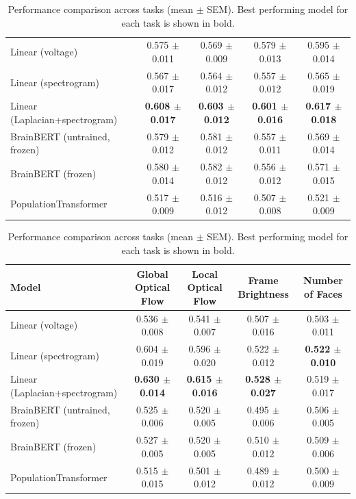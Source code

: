 \begin{table}[h]
\begin{tabular}{lcccc}
\hline
Linear (voltage) & 0.575 $\pm$ 0.011 & 0.569 $\pm$ 0.009 & 0.579 $\pm$ 0.013 & 0.595 $\pm$ 0.014 \\
Linear (spectrogram) & 0.567 $\pm$ 0.017 & 0.564 $\pm$ 0.012 & 0.557 $\pm$ 0.012 & 0.565 $\pm$ 0.019 \\
Linear (Laplacian+spectrogram) & \textbf{0.608 $\pm$ 0.017} & \textbf{0.603 $\pm$ 0.012} & \textbf{0.601 $\pm$ 0.016} & \textbf{0.617 $\pm$ 0.018} \\
BrainBERT (untrained, frozen) & 0.579 $\pm$ 0.012 & 0.581 $\pm$ 0.012 & 0.557 $\pm$ 0.011 & 0.569 $\pm$ 0.014 \\
BrainBERT (frozen) & 0.580 $\pm$ 0.014 & 0.582 $\pm$ 0.012 & 0.556 $\pm$ 0.012 & 0.571 $\pm$ 0.015 \\
PopulationTransformer & 0.517 $\pm$ 0.009 & 0.516 $\pm$ 0.012 & 0.507 $\pm$ 0.008 & 0.521 $\pm$ 0.009 \\
\hline
\end{tabular}
\hspace{1em}
\begin{tabular}{lcccc}
\hline
Model & Global Optical Flow & Local Optical Flow & Frame Brightness & Number of Faces \\
\hline
Linear (voltage) & 0.536 $\pm$ 0.008 & 0.541 $\pm$ 0.007 & 0.507 $\pm$ 0.016 & 0.503 $\pm$ 0.011 \\
Linear (spectrogram) & 0.604 $\pm$ 0.019 & 0.596 $\pm$ 0.020 & 0.522 $\pm$ 0.012 & \textbf{0.522 $\pm$ 0.010} \\
Linear (Laplacian+spectrogram) & \textbf{0.630 $\pm$ 0.014} & \textbf{0.615 $\pm$ 0.016} & \textbf{0.528 $\pm$ 0.027} & 0.519 $\pm$ 0.017 \\
BrainBERT (untrained, frozen) & 0.525 $\pm$ 0.006 & 0.520 $\pm$ 0.005 & 0.495 $\pm$ 0.006 & 0.506 $\pm$ 0.005 \\
BrainBERT (frozen) & 0.527 $\pm$ 0.005 & 0.520 $\pm$ 0.005 & 0.510 $\pm$ 0.012 & 0.509 $\pm$ 0.006 \\
PopulationTransformer & 0.515 $\pm$ 0.015 & 0.501 $\pm$ 0.012 & 0.489 $\pm$ 0.012 & 0.500 $\pm$ 0.009 \\
\hline
\end{tabular}
\caption{Performance comparison across tasks (mean $\pm$ SEM). Best performing model for each task is shown in bold.}
\label{tab:performance_comparison}
\end{table}